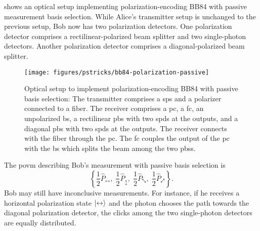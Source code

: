  shows an optical setup implementing polarization-encoding BB84 with passive measurement basis selection.
While Alice's transmitter setup is unchanged to the previous setup, Bob now has two polarization detectors.
One polarization detector comprises a rectilinear-polarized beam splitter and two single-photon detectors.
Another polarization detector comprises a diagonal-polarized beam splitter.
\begin{figure}[htb]
	\centering
	\texttt{[image: figures/pstricks/bb84-polarization-passive]}
	\caption{Optical setup to implement polarization-encoding BB84 with passive basis selection: The transmitter comprises a \gls{sps} and a polarizer connected to a fiber. The receiver comprises a \gls{pc}, a \gls{fc}, an unpolarized \gls{bs}, a rectilinear \gls{pbs} with two \gls{spd}s at the outputs, and a diagonal \gls{pbs} with two \gls{spd}s at the outputs. The receiver connects with the fiber through the \gls{pc}. The \gls{fc} couples the output of the \gls{pc} with the \gls{bs} which splits the beam among the two \gls{pbs}s.}\label{fig:polarization_encoding_passive}
\end{figure}
The \gls{povm} describing Bob's measurement with passive basis selection is
\begin{equation}
	\left\{
		\frac{1}{2}\hat{P}_{\leftrightarrow},
		\;
		\frac{1}{2}\hat{P}_{\updownarrow},
		\;
		\frac{1}{2}\hat{P}_{\nwsearrow},
		\;
		\frac{1}{2}\hat{P}_{\neswarrow}
	\right\}
	.
\end{equation}
Bob may still have inconclusive measurements.
For instance, if he receives a horizontal polarization state $\lvert\leftrightarrow\rangle$ and the photon chooses the path towards the diagonal polarization detector, the clicks among the two single-photon detectors are equally distributed.
